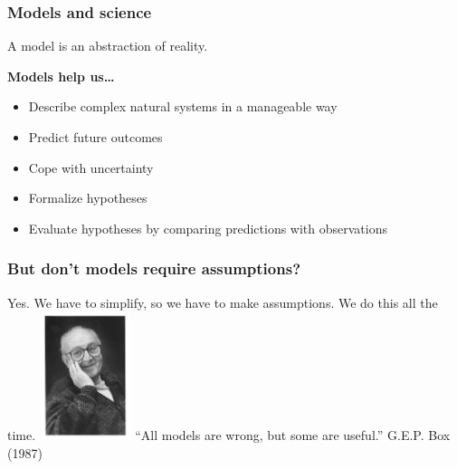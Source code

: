 \documentclass[color=usenames,dvipsnames]{beamer}\usepackage[]{graphicx}\usepackage[]{color}
\begin{document}



\begin{frame}
  \frametitle{Models and science}
  \Large
  A model is an abstraction of reality. \par
  \pause
  \vfill
  \Large
  {\bf Models help us\dots}
  \begin{itemize}[<+->]
    \item Describe complex natural systems in a manageable way
    \item Predict future outcomes
    \item Cope with uncertainty %
    \item Formalize hypotheses
    \item Evaluate hypotheses by comparing predictions with observations
  \end{itemize}
\end{frame}




\begin{frame}
  \frametitle{But don't models require assumptions?}
  \large
  \pause
  Yes. %
  \pause
  \vfill
  We have to simplify, so we have to make assumptions.
  \pause
  \vfill
  We do this all the time.
  \pause
  \vfill
  \includegraphics[width=0.2\textwidth]{figs/Box}
  ``All models are wrong, but some are useful.'' G.E.P. Box (1987)
\end{frame}
\end{document}
